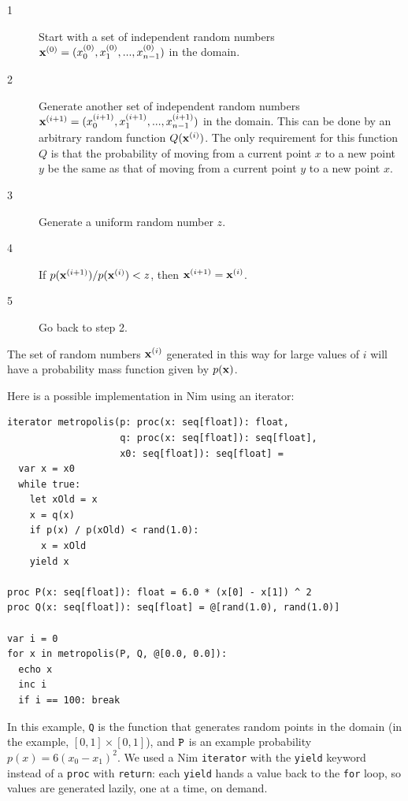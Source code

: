 \documentclass[justified, sixbynine]{tufte-book}
\def\ft{\small\tt}
\theoremstyle{plain}%
\newtheorem * {corollary}{Corollary}
\theoremstyle{definition}
\theoremstyle{remark}
\newtheorem * {remark}{Remark}
\newtheorem * {note}{Note}
\begin{document}
\begin{fullwidth}
\begin{description}
\item[1]  Start with a set of independent random numbers ${\bf x}%
^{(0)}=(x_0^{(0)}, x_1^{(0)}, ..., x_{n-1}^{(0)})$ in the domain.

\item[2]  Generate another set of independent random numbers ${\bf x}%
^{(i+1)}=(x_0^{(i+1)}, x_1^{(i+1)}, ..., x_{n-1}^{(i+1)})$ in the domain. This can be done by an arbitrary random function $Q({\bf x}^{(i)})$. The only requirement for this function $Q$ is that the probability of moving from a current point $x$ to a new point $y$ be the same as that of moving from a current point $y$ to a new point $x$.

\item[3]  Generate a uniform random number $z$.

\item[4]  If $p({\bf x}^{(i+1)})/p({\bf x}^{(i)})<z$, then ${\bf x}^{(i+1)}=%
{\bf x}^{(i)}$.

\item[5]  Go back to step 2.
\end{description}

The set of random numbers ${\bf x}^{(i)}$ generated in this way for large
values of $i$ will have a probability mass function given by $p({\bf x})$.

Here is a possible implementation in Nim using an iterator:
\begin{lstlisting}
iterator metropolis(p: proc(x: seq[float]): float,
                    q: proc(x: seq[float]): seq[float],
                    x0: seq[float]): seq[float] =
  var x = x0
  while true:
    let xOld = x
    x = q(x)
    if p(x) / p(xOld) < rand(1.0):
      x = xOld
    yield x

proc P(x: seq[float]): float = 6.0 * (x[0] - x[1]) ^ 2
proc Q(x: seq[float]): seq[float] = @[rand(1.0), rand(1.0)]

var i = 0
for x in metropolis(P, Q, @[0.0, 0.0]):
  echo x
  inc i
  if i == 100: break
\end{lstlisting}

In this example, {\ft Q} is the function that generates random points in the domain (in the example, $[0, 1]\times[0, 1]$), and ${\ft P}$ is an example probability $p(x) = 6(x_0-x_1)^2$. We used a Nim {\ft iterator} with the {\ft yield} keyword instead of a {\ft proc} with {\ft return}: each {\ft yield} hands a value back to the {\ft for} loop, so values are generated lazily, one at a time, on demand.


\end{fullwidth}
\end{document}
